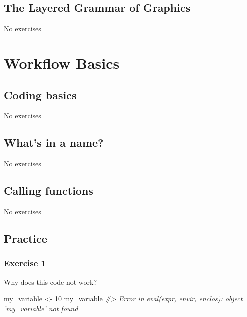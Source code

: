 \documentclass[]{book}
\newenvironment{Shaded}{\begin{snugshade}}{\end{snugshade}}
\newcommand{\CommentTok}[1]{\textcolor[rgb]{0.56,0.35,0.01}{\textit{#1}}}
\newcommand{\DecValTok}[1]{\textcolor[rgb]{0.00,0.00,0.81}{#1}}
\newcommand{\NormalTok}[1]{#1}
\newcommand{\StringTok}[1]{\textcolor[rgb]{0.31,0.60,0.02}{#1}}
\theoremstyle{plain}
\theoremstyle{remark}
\theoremstyle{definition}
\theoremstyle{definition}
\theoremstyle{definition}
\theoremstyle{remark}
\begin{document}
\hypertarget{the-layered-grammar-of-graphics}{%
\section{The Layered Grammar of
Graphics}\label{the-layered-grammar-of-graphics}}

No exercises

\hypertarget{workflow-basics}{%
\chapter{Workflow Basics}\label{workflow-basics}}

\hypertarget{coding-basics}{%
\section{Coding basics}\label{coding-basics}}

No exercises

\hypertarget{whats-in-a-name}{%
\section{What's in a name?}\label{whats-in-a-name}}

No exercises

\hypertarget{calling-functions}{%
\section{Calling functions}\label{calling-functions}}

No exercises

\hypertarget{practice}{%
\section{Practice}\label{practice}}

\hypertarget{exercise-1-5}{%
\subsection{Exercise 1}\label{exercise-1-5}}

Why does this code not work?

\begin{Shaded}
\begin{Highlighting}[]
\NormalTok{my_variable <-}\StringTok{ }\DecValTok{10}
\NormalTok{my_varıable}
\CommentTok{#> Error in eval(expr, envir, enclos): object 'my_varıable' not found}
\end{Highlighting}
\end{Shaded}
\end{document}
